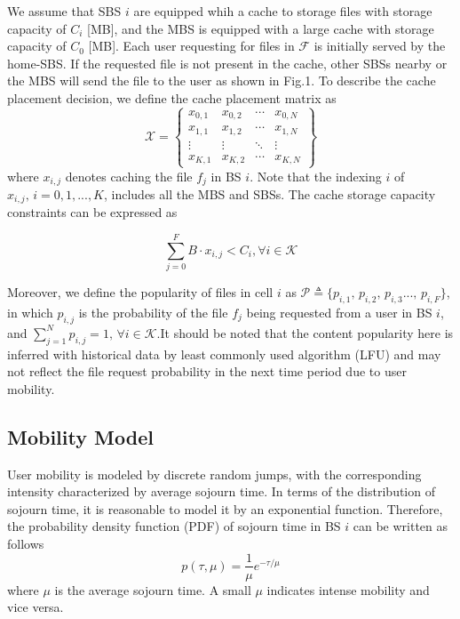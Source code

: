 \documentclass[conference]{IEEEtran}
\begin{document}
We assume that SBS $i$ are equipped whih a cache to storage files with storage capacity of $C_i$ [MB], and the MBS is equipped with a large cache with storage capacity of
$C_0$ [MB]. Each user requesting for files in $\mathcal{F}$ is initially served by the home-SBS. If the requested file is not present in the cache, other SBSs nearby or the MBS will send the file to the user as shown in Fig.1. To describe the cache placement decision, we define the cache placement matrix as
$$\mathcal{X}=
\begin{Bmatrix}
x_{0,1}    &x_{0,2}  & \cdots & x_{0,N} \\
x_{1,1}    &x_{1,2}  & \cdots & x_{1,N} \\
\vdots    &\vdots  & \ddots &\vdots \\
x_{K,1}    &x_{K,2}  & \cdots & x_{K,N}
\end{Bmatrix}
$$
where $x_{i,j}$ denotes caching the file $f_j$ in BS $i$. Note that the indexing $i$ of $x_{i,j}\mathrm{,\,} i=0,1,...,K$, includes all the MBS and SBSs. The cache storage capacity constraints can be expressed as

\begin{equation}
\sum_{j=0}^F B\cdot x_{i,j}<C_i,\forall{i}\in\mathcal{K}
\end{equation}

Moreover, we define the popularity of files in cell $i$ as $\mathcal{P} \triangleq\{p_{i,1}\mathrm{,\,}p_{i,2}\mathrm{,\,}p_{i,3}...\mathrm{,\,}p_{i,F}\}$, in which $p_{i,j}$ is the probability of the file $f_j$ being requested from a user in BS $i$, and $ \sum_{j=1}^N p_{i,j}=1,\,\forall{i}\in\mathcal{K}$.It should be noted that the content popularity here is inferred with historical data by least commonly used algorithm (LFU) and may not reflect the file request probability in the next time period due to user mobility.

\subsection{Mobility Model}
User mobility is modeled by discrete random jumps, with the corresponding intensity characterized by average sojourn time. In terms of the distribution of sojourn time, it is reasonable to model it by an exponential function\cite{8013789}. Therefore, the probability density function (PDF) of sojourn time in BS $i$ can be written as follows
\begin{equation}
p(\tau,\mu)=\frac{1}{\mu}e^{-\tau/\mu}
\end{equation}
where $\mu$ is the average sojourn time. A small $\mu$ indicates intense mobility and vice versa.
\end{document}

